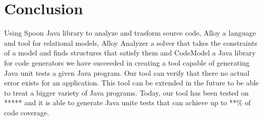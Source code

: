 \chapter*{Conclusion}
\label{ch:Conclusion}
	\thispagestyle{conclusion}
	 Using Spoon Java library to analyze and trasform source code, Alloy a language and tool for relational models, Alloy Analyzer a solver that takes the constraints of a model and finds structures that satisfy them and CodeModel a Java library for code generators we have succeeded in creating a tool capable of generating Java unit tests a given Java program. Our tool can verify that there no actual error exists for an application. This tool can be extended in the future to be able to treat a bigger variety of Java programs. Today, our tool has been tested on ***** and it is able to generate Java unite tests that can achieve up to **\% of code coverage.